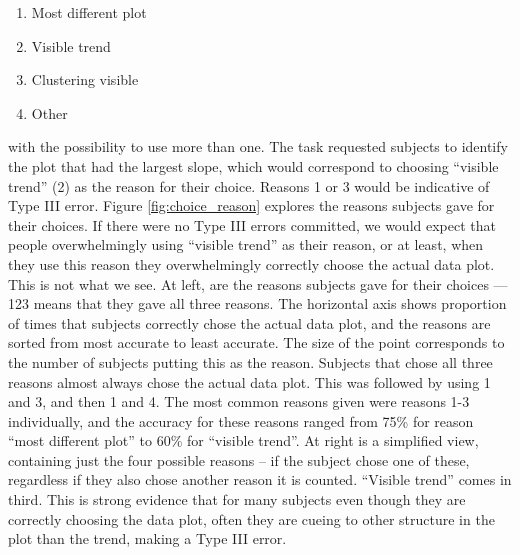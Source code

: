 \documentclass{article}
\newcommand{\blue}[1]{{\color{blue} #1}} %
\newcommand{\green}[1]{{\color{green} #1}} %
\begin{document}
\begin{enumerate} \itemsep 0in
\item Most different plot
\item Visible trend
\item Clustering visible
\item Other
\end{enumerate}


\noindent with the possibility to use more than one. The task requested subjects to identify the plot that had the largest slope, which would correspond to choosing ``visible trend'' (2) as the reason for their choice. Reasons 1 or 3 would be indicative of Type III error. Figure \ref{fig:choice_reason} explores the reasons subjects gave for their choices. If there were no Type III errors committed, we would expect that people overwhelmingly using ``visible trend'' as their reason, or at least, when they use this reason they overwhelmingly correctly choose the actual data plot. This is not what we see. At left, are the reasons subjects gave for their choices --- 123 means that they gave all three reasons. The horizontal axis shows proportion of times that subjects correctly chose the actual data plot, and the reasons are sorted from most accurate to least accurate. The size of the point corresponds to the number of subjects putting this as the reason. Subjects that chose all three reasons almost always chose the actual data plot. This was followed by using 1 and 3, and then 1 and 4. The most common reasons given were reasons 1-3 individually, and the accuracy for these reasons ranged from 75\% for reason ``most different plot'' to 60\% for ``visible trend''.
At right is a simplified view, containing just the four possible reasons -- if the subject chose one of these, regardless if they also chose another reason it is counted. ``Visible trend'' comes in third. This is strong evidence that for many subjects even though they are correctly choosing the data plot, often they are cueing to other structure in the plot than the trend, making a Type III error. 


\end{document}
